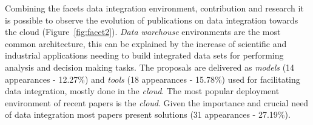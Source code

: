 Combining the facets data integration environment, contribution
and research it is possible to observe  the evolution of publications on data integration towards the cloud (Figure~\ref{fig:facet2}).  {\em Data warehouse} environments are the most common architecture, this can be explained by the increase of scientific  and industrial applications needing to build integrated  data sets for performing analysis and decision making tasks. The proposals are delivered as {\em models}  (14  appearances - 12.27\%)  and {\em tools} (18
appearances - 15.78\%)  used for facilitating data integration, mostly done in the {\em cloud}.  The most popular deployment environment of recent papers is the {\em cloud}. Given the importance and crucial need of data integration  most papers present solutions (31 appearances - 27.19\%).








 
